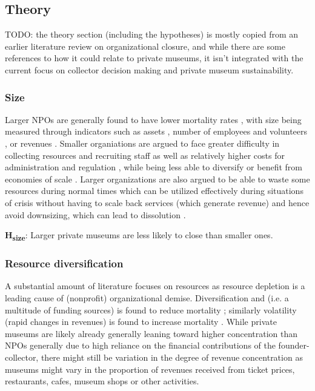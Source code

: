 \documentclass[11pt]{article}
\begin{document}
\subsection*{Theory}


TODO: the theory section (including the hypotheses) is mostly copied from an earlier literature review on organizational closure, and while there are some references to how it could relate to private museums, it isn't integrated with the current focus on collector decision making and private museum sustainability. 

\subsubsection*{Size}


Larger NPOs are generally found to have lower mortality rates \parencite{Hager_1999_demise,Duckles_Hager_Galaskiewicz_2005_close}, with size being measured through indicators such as assets \parencite{Lu_Shon_Zhang_2019_dissolution}, number of employees \parencite{Bielefeld_1994_survival} and volunteers \parencite{Fernandez_2007_dissolution}, or revenues \parencite{Searing_2020_zombies}.
Smaller organiations are argued to face greater difficulty in collecting resources and recruiting staff as well as relatively higher costs for administration and regulation \parencite{Helmig_Ingerfurth_Pinz_2013_nonprofit}, while being less able to diversify or benefit from economies of scale \parencite{Hager_1999_demise}. 
Larger organizations are also argued to be able to waste some resources during normal times which can be utilized effectively during situations of crisis without having to scale back services (which generate revenue) \parencite{Hager_2001_vulnerability} and hence avoid downsizing, which can lead to dissolution \parencite{Duckles_Hager_Galaskiewicz_2005_close,Bielefeld_1994_survival}. 

\bigbreak
\noindent
\textbf{H\textsubscript{size}}: Larger private museums are less likely to close than smaller ones.




\subsubsection*{Resource diversification}


A substantial amount of literature focuses on resources as resource depletion is a leading cause of (nonprofit) organizational demise. 
Diversification and (i.e. a multitude of funding sources) is found to reduce mortality \parencite{Fernandez_2007_dissolution,Bielefeld_1994_survival,Hager_2001_vulnerability,Lu_Shon_Zhang_2019_dissolution}; similarly volatility (rapid changes in revenues) is found to increase mortality \parencite{Mayer_2022_slimmer}. 
While private museums are likely already generally leaning toward higher concentration than NPOs generally due to high reliance on the financial contributions of the founder-collector, there might still be variation in the degree of revenue concentration as museums might vary in the proportion of revenues received from ticket prices, restaurants, cafes, museum shops or other activities. 
\end{document}
